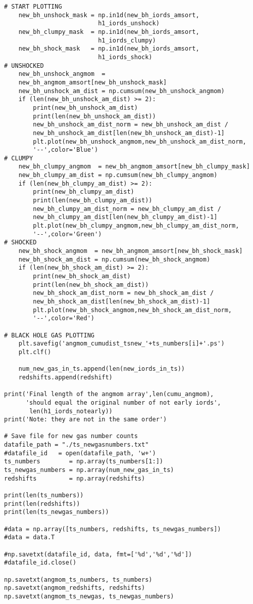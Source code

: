\documentclass[12pt,headA,chapB]{fiskthesis}
\begin{document}
\begin{verbatim}
# START PLOTTING
    new_bh_unshock_mask = np.in1d(new_bh_iords_amsort,
                          h1_iords_unshock)
    new_bh_clumpy_mask  = np.in1d(new_bh_iords_amsort,
                          h1_iords_clumpy)
    new_bh_shock_mask   = np.in1d(new_bh_iords_amsort,
                          h1_iords_shock)
# UNSHOCKED
    new_bh_unshock_angmom  = 
    new_bh_angmom_amsort[new_bh_unshock_mask]
    new_bh_unshock_am_dist = np.cumsum(new_bh_unshock_angmom)
    if (len(new_bh_unshock_am_dist) >= 2):
        print(new_bh_unshock_am_dist)
        print(len(new_bh_unshock_am_dist))
        new_bh_unshock_am_dist_norm = new_bh_unshock_am_dist / 
        new_bh_unshock_am_dist[len(new_bh_unshock_am_dist)-1]
        plt.plot(new_bh_unshock_angmom,new_bh_unshock_am_dist_norm,
        '--',color='Blue')
# CLUMPY
    new_bh_clumpy_angmom  = new_bh_angmom_amsort[new_bh_clumpy_mask]
    new_bh_clumpy_am_dist = np.cumsum(new_bh_clumpy_angmom)
    if (len(new_bh_clumpy_am_dist) >= 2):
        print(new_bh_clumpy_am_dist)
        print(len(new_bh_clumpy_am_dist))
        new_bh_clumpy_am_dist_norm = new_bh_clumpy_am_dist / 
        new_bh_clumpy_am_dist[len(new_bh_clumpy_am_dist)-1]
        plt.plot(new_bh_clumpy_angmom,new_bh_clumpy_am_dist_norm,
        '--',color='Green')
# SHOCKED
    new_bh_shock_angmom  = new_bh_angmom_amsort[new_bh_shock_mask]
    new_bh_shock_am_dist = np.cumsum(new_bh_shock_angmom)
    if (len(new_bh_shock_am_dist) >= 2):
        print(new_bh_shock_am_dist)
        print(len(new_bh_shock_am_dist))
        new_bh_shock_am_dist_norm = new_bh_shock_am_dist / 
        new_bh_shock_am_dist[len(new_bh_shock_am_dist)-1]
        plt.plot(new_bh_shock_angmom,new_bh_shock_am_dist_norm,
        '--',color='Red')

# BLACK HOLE GAS PLOTTING
    plt.savefig('angmom_cumudist_tsnew_'+ts_numbers[i]+'.ps')
    plt.clf()

    num_new_gas_in_ts.append(len(new_iords_in_ts))
    redshifts.append(redshift)

print('Final length of the angmom array',len(cumu_angmom),
      'should equal the original number of not early iords',
       len(h1_iords_notearly))
print('Note: they are not in the same order')

# Save file for new gas number counts
datafile_path = "./ts_newgasnumbers.txt"
#datafile_id   = open(datafile_path, 'w+')
ts_numbers        = np.array(ts_numbers[1:])
ts_newgas_numbers = np.array(num_new_gas_in_ts)
redshifts         = np.array(redshifts)

print(len(ts_numbers))
print(len(redshifts))
print(len(ts_newgas_numbers))

#data = np.array([ts_numbers, redshifts, ts_newgas_numbers])
#data = data.T

#np.savetxt(datafile_id, data, fmt=['%d','%d','%d'])
#datafile_id.close()

np.savetxt(angmom_ts_numbers, ts_numbers)
np.savetxt(angmom_redshifts, redshifts)
np.savetxt(angmom_ts_newgas, ts_newgas_numbers)
\end{verbatim}
\end{document}
